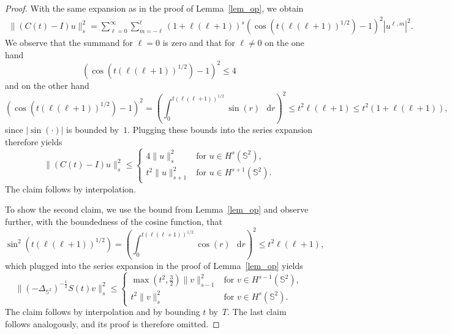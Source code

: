 \documentclass[a4paper]{amsart}
\theoremstyle{remark}
\theoremstyle{definition}
\newcommand{\IS}{\mathbb{S}}
\newcommand*\dd{\mathop{}\!\mathrm{d}}
\begin{document}
\begin{proof}
    With the same expansion as in the proof of Lemma~\ref{lem_op}, we obtain
    \begin{align*}
        \| (C(t) - I)u \|_s^2
            = \sum_{\ell=0}^\infty \sum_{m=-\ell}^\ell (1+\ell(\ell+1))^{s} (\cos(t(\ell(\ell+1))^{1/2}) - 1)^2 |u^{\ell,m}|^2.
    \end{align*}
    We observe that the summand for $\ell=0$ is zero and that for $\ell \neq 0$ on the one hand 
    \begin{equation*}
        (\cos(t(\ell(\ell+1))^{1/2}) - 1)^2 \le 4
    \end{equation*}
    and on the other hand 
    \begin{equation*}
        (\cos(t(\ell(\ell+1))^{1/2}) - 1)^2
            = \left( \int_0^{t(\ell(\ell+1))^{1/2}} \sin(r) \, \dd r \right)^2
            \le t^2 \ell(\ell+1)
            \le t^2 (1+\ell(\ell+1)),
    \end{equation*}
    since $|\sin(\cdot)|$ is bounded by~$1$. Plugging these bounds into the series expansion therefore yields
    \begin{equation*}
        \| (C(t) - I)u \|_s^2
        \le
        \begin{cases}
            4 \|u\|_s^2 & \text{for } u \in H^s(\IS^2),\\
            t^2 \|u\|_{s+1}^2 & \text{for } u \in H^{s+1}(\IS^2).
        \end{cases}
    \end{equation*}
    The claim follows by interpolation.

    To show the second claim, we use the bound from Lemma~\ref{lem_op} and observe further, with the boundedness of the cosine function, that
    \begin{equation*}
        \sin^2(t(\ell(\ell+1))^{1/2})
            = \left( \int_0^{t(\ell(\ell+1))^{1/2}} \cos(r) \, \dd r\right)^2
            \le t^2 \ell(\ell+1),
    \end{equation*}
    which plugged into the series expansion in the proof of Lemma~\ref{lem_op} yields
    \begin{equation*}
        \| (-\Delta_{\mathbb{S}^2})^{-\frac{1}{2}} S(t)v \|_s^2
        \le
        \begin{cases}
            \max\left(t^2,\tfrac{3}{2}\right) \|v\|_{s-1}^2 & \text{for } v \in H^{s-1}(\IS^2),\\
            t^2 \|v\|_{s}^2 & \text{for } v \in H^{s}(\IS^2).
        \end{cases}
    \end{equation*}
    The claim follows by interpolation and by bounding $t$ by~$T$.
    The last claim follows analogously, and its proof is therefore omitted.
\end{proof}
\end{document}
